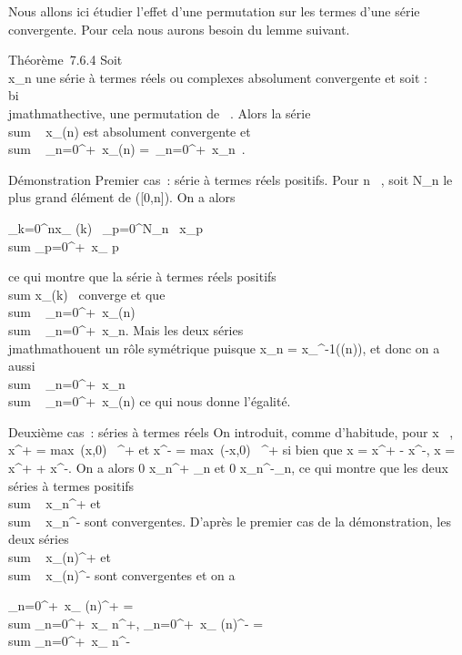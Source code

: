 \documentclass[]{article}
\begin{document}
Nous allons ici étudier l'effet d'une permutation sur les termes d'une
série convergente. Pour cela nous aurons besoin du lemme suivant.

Théorème~7.6.4 Soit \\\sum
 x_n une série à termes réels ou complexes absolument
convergente et soit \sigma : ~ \rightarrow~ ~ bi\\jmathmathective, une permutation de ~. Alors la
série \\sum ~
x_\sigma(n) est absolument convergente et
\\sum ~
_n=0^+\infty~x_\sigma(n) =\
\sum  _n=0^+\infty~x_n~.

Démonstration Premier cas~: série à termes réels positifs. Pour n \in {}~,
soit N_n le plus grand élément de \sigma({[}0,n{]}). On a alors

\sum _k=0^nx_ \sigma(k)~
\leq\sum _p=0^N_n~
x_p \leq\\sum
_p=0^+\infty~x_ p

ce qui montre que la série à termes réels positifs
\\sum  x_\sigma(k)~
converge et que \\sum ~
_n=0^+\infty~x_\sigma(n)
\leq\\sum ~
_n=0^+\infty~x_n. Mais les deux séries \\jmathmathouent un rôle
symétrique puisque x_n = x_\sigma^-1(\sigma(n)), et
donc on a aussi \\sum ~
_n=0^+\infty~x_n
\leq\\sum ~
_n=0^+\infty~x_\sigma(n) ce qui nous donne l'égalité.

Deuxième cas~: séries à termes réels On introduit, comme d'habitude,
pour x \in {}~, x^+ = max~(x,0) \in
{}~^+ et x^- = max~(-x,0) \in
\mathbb{R}~^+ si bien que x = x^+ - x^-,
x = x^+ + x^-. On a alors 0 _n^+ \leqx_n et 0 \leq
x_n^-\leqx_n, ce qui montre
que les deux séries à termes positifs
\\sum ~
x_n^+ et
\\sum ~
x_n^- sont convergentes. D'après le premier cas de la
démonstration, les deux séries
\\sum ~
x_\sigma(n)^+ et
\\sum ~
x_\sigma(n)^- sont convergentes et on a

\sum _n=0^+\infty~x_
\sigma(n)^+ = \\sum
_n=0^+\infty~x_ n^+,\quad
\sum _n=0^+\infty~x_
\sigma(n)^- = \\sum
_n=0^+\infty~x_ n^-
\end{document}
